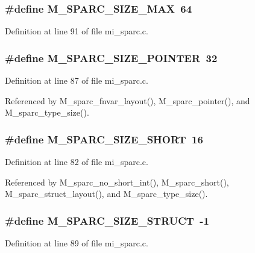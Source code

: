 \subsubsection{\setlength{\rightskip}{0pt plus 5cm}\#define M\_\-SPARC\_\-SIZE\_\-MAX~64}\label{mi__sparc_8c_1ebabb382ada29ae117b17d3ef2476f0}




Definition at line 91 of file mi\_\-sparc.c.
\subsubsection{\setlength{\rightskip}{0pt plus 5cm}\#define M\_\-SPARC\_\-SIZE\_\-POINTER~32}\label{mi__sparc_8c_68e861c06006b8397c6b9ed4f3db6b20}




Definition at line 87 of file mi\_\-sparc.c.

Referenced by M\_\-sparc\_\-fnvar\_\-layout(), M\_\-sparc\_\-pointer(), and M\_\-sparc\_\-type\_\-size().
\subsubsection{\setlength{\rightskip}{0pt plus 5cm}\#define M\_\-SPARC\_\-SIZE\_\-SHORT~16}\label{mi__sparc_8c_d348633368ef8037e758f9153b6e9339}




Definition at line 82 of file mi\_\-sparc.c.

Referenced by M\_\-sparc\_\-no\_\-short\_\-int(), M\_\-sparc\_\-short(), M\_\-sparc\_\-struct\_\-layout(), and M\_\-sparc\_\-type\_\-size().
\subsubsection{\setlength{\rightskip}{0pt plus 5cm}\#define M\_\-SPARC\_\-SIZE\_\-STRUCT~-1}\label{mi__sparc_8c_6cce3fdf74717acb30a1eae7da41f894}




Definition at line 89 of file mi\_\-sparc.c.

